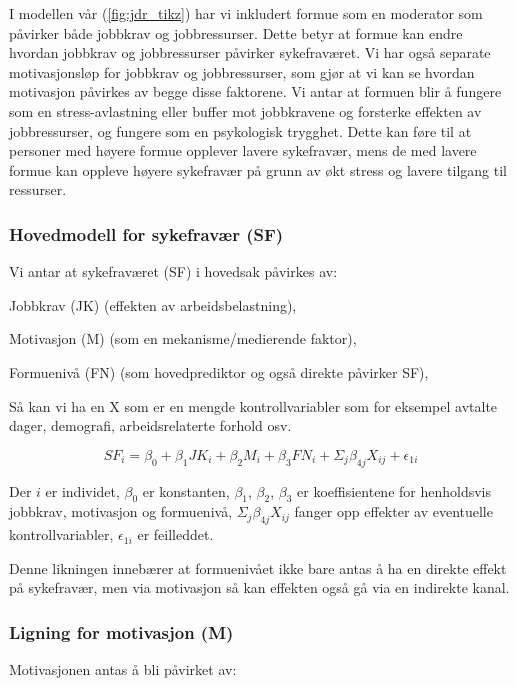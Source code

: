 \documentclass[
  12pt,
  a4paper,
  DIV=11,
  numbers=noendperiod]{scrartcl}
\begin{document}
I modellen vår (\autoref{fig:jdr_tikz}) har vi inkludert formue som en
moderator som påvirker både jobbkrav og jobbressurser. Dette betyr at
formue kan endre hvordan jobbkrav og jobbressurser påvirker
sykefraværet. Vi har også separate motivasjonsløp for jobbkrav og
jobbressurser, som gjør at vi kan se hvordan motivasjon påvirkes av
begge disse faktorene. Vi antar at formuen blir å fungere som en
stress-avlastning eller buffer mot jobbkravene og forsterke effekten av
jobbressurser, og fungere som en psykologisk trygghet. Dette kan føre
til at personer med høyere formue opplever lavere sykefravær, mens de
med lavere formue kan oppleve høyere sykefravær på grunn av økt stress
og lavere tilgang til ressurser.

\subsubsection{Hovedmodell for sykefravær
(SF)}\label{hovedmodell-for-sykefravuxe6r-sf}

Vi antar at sykefraværet (SF) i hovedsak påvirkes av:

Jobbkrav (JK) (effekten av arbeidsbelastning),

Motivasjon (M) (som en mekanisme/medierende faktor),

Formuenivå (FN) (som hovedprediktor og også direkte påvirker SF),

Så kan vi ha en X som er en mengde kontrollvariabler som for eksempel
avtalte dager, demografi, arbeidsrelaterte forhold osv.

\[
SF_i = \beta_0 + \beta_1 JK_i + \beta_2 M_i + \beta_3 FN_i + \Sigma_j \beta_{4j}X_{ij} + \epsilon_{1i}
\]

Der \(i\) er individet, \(\beta_0\) er konstanten, \(\beta_1\),
\(\beta_2\), \(\beta_3\) er koeffisientene for henholdsvis jobbkrav,
motivasjon og formuenivå, \(\Sigma_j \beta_{4j}X_{ij}\) fanger opp
effekter av eventuelle kontrollvariabler, \(\epsilon_{1i}\) er
feilleddet.

Denne likningen innebærer at formuenivået ikke bare antas å ha en
direkte effekt på sykefravær, men via motivasjon så kan effekten også gå
via en indirekte kanal.

\subsubsection{Ligning for motivasjon
(M)}\label{ligning-for-motivasjon-m}

Motivasjonen antas å bli påvirket av:
\end{document}

